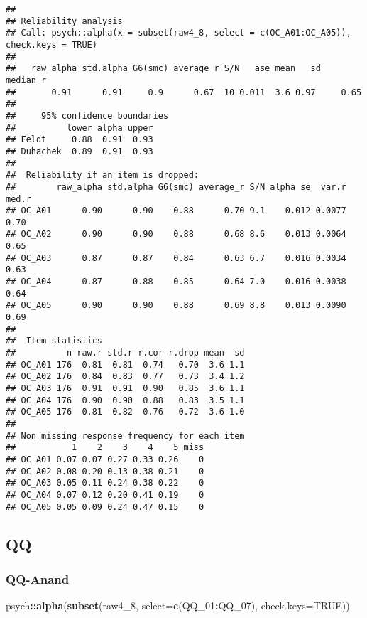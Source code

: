 \documentclass[
]{article}
\newenvironment{Shaded}{\begin{snugshade}}{\end{snugshade}}
\newcommand{\AttributeTok}[1]{\textcolor[rgb]{0.13,0.29,0.53}{#1}}
\newcommand{\ConstantTok}[1]{\textcolor[rgb]{0.56,0.35,0.01}{#1}}
\newcommand{\FunctionTok}[1]{\textcolor[rgb]{0.13,0.29,0.53}{\textbf{#1}}}
\newcommand{\NormalTok}[1]{#1}
\newcommand{\SpecialCharTok}[1]{\textcolor[rgb]{0.81,0.36,0.00}{\textbf{#1}}}
\begin{document}
\begin{verbatim}
## 
## Reliability analysis   
## Call: psych::alpha(x = subset(raw4_8, select = c(OC_A01:OC_A05)), check.keys = TRUE)
## 
##   raw_alpha std.alpha G6(smc) average_r S/N   ase mean   sd median_r
##       0.91      0.91     0.9      0.67  10 0.011  3.6 0.97     0.65
## 
##     95% confidence boundaries 
##          lower alpha upper
## Feldt     0.88  0.91  0.93
## Duhachek  0.89  0.91  0.93
## 
##  Reliability if an item is dropped:
##        raw_alpha std.alpha G6(smc) average_r S/N alpha se  var.r med.r
## OC_A01      0.90      0.90    0.88      0.70 9.1    0.012 0.0077  0.70
## OC_A02      0.90      0.90    0.88      0.68 8.6    0.013 0.0064  0.65
## OC_A03      0.87      0.87    0.84      0.63 6.7    0.016 0.0034  0.63
## OC_A04      0.87      0.88    0.85      0.64 7.0    0.016 0.0038  0.64
## OC_A05      0.90      0.90    0.88      0.69 8.8    0.013 0.0090  0.69
## 
##  Item statistics 
##          n raw.r std.r r.cor r.drop mean  sd
## OC_A01 176  0.81  0.81  0.74   0.70  3.6 1.1
## OC_A02 176  0.84  0.83  0.77   0.73  3.4 1.2
## OC_A03 176  0.91  0.91  0.90   0.85  3.6 1.1
## OC_A04 176  0.90  0.90  0.88   0.83  3.5 1.1
## OC_A05 176  0.81  0.82  0.76   0.72  3.6 1.0
## 
## Non missing response frequency for each item
##           1    2    3    4    5 miss
## OC_A01 0.07 0.07 0.27 0.33 0.26    0
## OC_A02 0.08 0.20 0.13 0.38 0.21    0
## OC_A03 0.05 0.11 0.24 0.38 0.22    0
## OC_A04 0.07 0.12 0.20 0.41 0.19    0
## OC_A05 0.05 0.09 0.24 0.47 0.15    0
\end{verbatim}

\subsection{QQ}\label{qq}

\subsubsection{QQ-Anand}\label{qq-anand}

\begin{Shaded}
\begin{Highlighting}[]
\NormalTok{psych}\SpecialCharTok{::}\FunctionTok{alpha}\NormalTok{(}\FunctionTok{subset}\NormalTok{(raw4\_8, }\AttributeTok{select=}\FunctionTok{c}\NormalTok{(QQ\_01}\SpecialCharTok{:}\NormalTok{QQ\_07), }\AttributeTok{check.keys=}\ConstantTok{TRUE}\NormalTok{))}
\end{Highlighting}
\end{Shaded}
\end{document}
